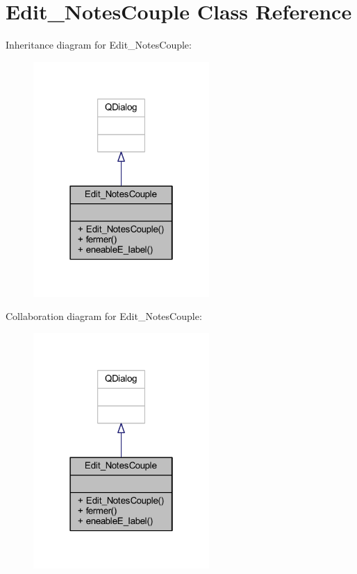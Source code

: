 \hypertarget{class_edit___notes_couple}{}\section{Edit\+\_\+\+Notes\+Couple Class Reference}
\label{class_edit___notes_couple}


Inheritance diagram for Edit\+\_\+\+Notes\+Couple\+:\nopagebreak
\begin{figure}[H]
\begin{center}
\leavevmode
\includegraphics[width=190pt]{class_edit___notes_couple__inherit__graph}
\end{center}
\end{figure}


Collaboration diagram for Edit\+\_\+\+Notes\+Couple\+:\nopagebreak
\begin{figure}[H]
\begin{center}
\leavevmode
\includegraphics[width=190pt]{class_edit___notes_couple__coll__graph}
\end{center}
\end{figure}
